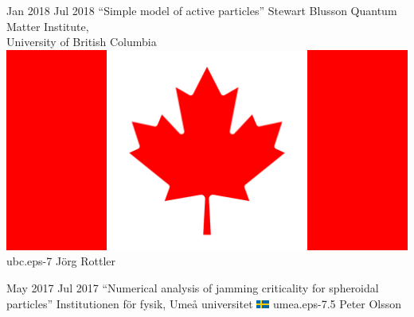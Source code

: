 \documentclass[letterpaper]{cvtemplate_en} %
\begin{document}
\begin{cvbody}
\cvitem
	{Jan 2018}
	{Jul 2018}
  {``Simple model of active particles''}
  {Stewart Blusson Quantum Matter Institute,\\ University of British Columbia \includegraphics[height=0.8\myheight]{ca}}
  {ubc.eps}{}{-7}
  {J\"org Rottler}
  {\\
  }

\cvitem
	{May 2017}
	{Jul 2017}
	{``Numerical analysis of jamming criticality for spheroidal particles''}
	{Institutionen f\"{o}r fysik, Ume\r{a} universitet \includegraphics[height=0.8\myheight]{se}}
	{umea.eps}{}{-7.5}
	{Peter Olsson}
	{\\
	}


\end{cvbody}
\end{document}
